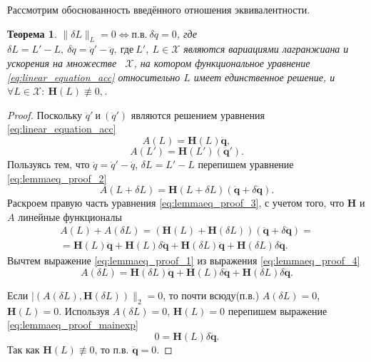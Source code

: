 \documentclass[a4paper, 12pt]{article}
\newtheorem{theorem}{Теорема}
\begin{document}
Рассмотрим обоснованность введённого отношения эквивалентности.
\begin{theorem} \label{lemmaeq}
$\|\delta L\|_L = 0 \Leftrightarrow \text{п.в.}~\delta \ddot{q} = 0$, где $\delta L = L' - L, ~\delta \ddot{q} = \ddot{q}' - \ddot{q}, ~\text{где} \ L',\ L \in \mathcal {X}$ являются вариациями лагранжиана и ускорения на множестве ~$\mathcal {X}$, на котором функциональное уравнение \ref{eq:linear_equation_acc} относительно $L$ имеет единственное решение, и $\forall L\in \mathcal{X}:~\mathbf{H}(L) \not\equiv 0, $.
\end{theorem}
\begin{proof}
Поскольку $\ddot{q}' ~\text{и} ~(\ddot{q}')$ являются решением уравнения \ref{eq:linear_equation_acc} 
\begin{equation}
\label{eq:lemmaeq_proof_1}
A(L) = \mathbf{H}(L)\ddot{\mathbf{q}},
\end{equation}
\begin{equation}
\label{eq:lemmaeq_proof_2}
A(L') = \mathbf{H}(L')(\ddot{\mathbf{q}}').
\end{equation}
Пользуясь тем, что $\ddot{q} = \ddot{q}' - \ddot{q}$, $\delta L = L' - L$ перепишем уравнение \ref{eq:lemmaeq_proof_2}
\begin{equation}
\label{eq:lemmaeq_proof_3}
A(L+\delta L) = \mathbf{H}(L+\delta L)(\ddot{\mathbf{q}} + \delta \ddot{\mathbf{q}}).
\end{equation}
Раскроем правую часть уравнения \ref{eq:lemmaeq_proof_3}, с учетом того, что $\mathbf{H}$ и $A$ линейные функционалы
\begin{equation}
\label{eq:lemmaeq_proof_4}
\begin{split}
A(L)+A(\delta L) = (\mathbf{H}(L)+\mathbf{H}(\delta L))(\ddot{\mathbf{q}} + \delta \ddot{\mathbf{q}})=
\\
 = 
\mathbf{H}(L)\ddot{\mathbf{q}} + \mathbf{H}(L)\delta \ddot{\mathbf{q}} + \mathbf{H}(\delta L)\ddot{\mathbf{q}} + \mathbf{H}(\delta L)\delta \ddot{\mathbf{q}}.
\end{split}
\end{equation}
Вычтем выражение \ref{eq:lemmaeq_proof_1} из выражения \ref{eq:lemmaeq_proof_4}
\begin{equation}
\label{eq:lemmaeq_proof_mainexp}
A(\delta L) = \mathbf{H}(\delta L)\ddot{\mathbf{q}} + \mathbf{H}(L)\delta \ddot{\mathbf{q}} + \mathbf{H}(\delta L)\delta \ddot{\mathbf{q}}.
\end{equation}

Если $|(A(\delta L), \mathbf{H}(\delta L))\|_2 = 0$, то почти всюду(п.в.) $A(\delta L) = 0$, $\mathbf{H}(L) = 0$. Используя $A(\delta L) = 0$, $\mathbf{H}(L) = 0$ перепишем выражение
\ref{eq:lemmaeq_proof_mainexp}
\begin{equation}
\label{eq:lemmaeq_proof_5}
0 = \mathbf{H}(L)\delta \ddot{\mathbf{q}}.
\end{equation}
Так как $\mathbf{H}(L) \not\equiv0$, то п.в. $\ddot{\mathbf{q}} = 0$.


\end{proof}
\end{document}
